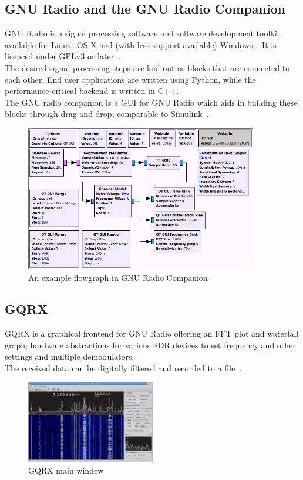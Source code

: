 \documentclass[conference]{IEEEtran}
\begin{document}
\subsection{GNU Radio and the GNU Radio Companion}
GNU Radio is a signal processing software and software development toolkit available for Linux, OS X and (with less support available) Windows~\cite{Gnu19FAQ}\cite{Gnu19What}. It is licenced under GPLv3 or later~\cite{Gnu19FAQ}.\\
The desired signal processing steps are laid out as blocks that are connected to each other. End user applications are written using Python, while the performance-critical backend is written in C++.\\
The GNU radio companion is a GUI for GNU Radio which aids in building these blocks through drag-and-drop, comparable to Simulink~\cite{Gnu19FAQ}.\\
\balance
\begin{figure}
	\centering
	\includegraphics[width=0.9\textwidth]{gnuradio_example_flowgraph}
	\caption{An example flowgraph in GNU Radio Companion~\cite{Gnu19Example}}
\end{figure}

\subsection{GQRX} \label{sec:GQRX}
GQRX is a graphical frontend for GNU Radio offering an FFT plot and waterfall graph, hardware abstractions for various SDR devices to set frequency and other settings and multiple demodulators.\\
The received data can be digitally filtered and recorded to a file~\cite{GQRX19Home}.
\begin{figure}[H]
	\centering
	\includegraphics[width=0.5\textwidth]{gqrx_main_window}
	\caption{GQRX main window~\cite{GQRX19Home}}
\end{figure}
\end{document}
